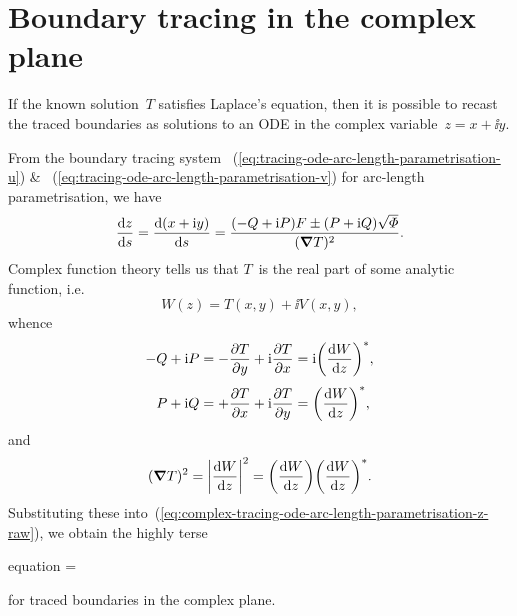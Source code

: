 \chapter{Boundary tracing in the complex plane}
\label{ch:complex}

If the known solution~$T$ satisfies Laplace's equation,
then it is possible to recast the traced boundaries
as solutions to an ODE in the complex variable~$z = x + \ii y$.

From the boundary tracing system~%
  (\ref{eq:tracing-ode-arc-length-parametrisation-u})
\&~%
  (\ref{eq:tracing-ode-arc-length-parametrisation-v})
for arc-length parametrisation,
we have
\begin{equation}
  \tder{z}{s}
    = \tder{(x + \ii y)}{s}
    = \frac{(-Q + \ii P) F \pm (P + \ii Q) \sqrt{\Phi}}{(\del T)^2}.
  \label{eq:complex-tracing-ode-arc-length-parametrisation-z-raw}
\end{equation}
Complex function theory tells us that
$T$~is the real part of some analytic function,
i.e.
\begin{equation}
  W (z) = T (x, y) + \ii V (x, y),
  \label{eq:complex-analytic-function-components}
\end{equation}
whence
\begin{align}
  -Q + \ii P
    &= -\pder{T}{y} + \ii \pder{T}{x}
    = \ii \conj{\roundbr*{\tder{W}{z}}},
      \label{eq:complex-tracing-ode-flux-factor}
      \\[\tallspace]
  P + \ii Q
    &= +\pder{T}{x} + \ii \pder{T}{y}
    = \conj{\roundbr*{\tder{W}{z}}},
      \label{eq:complex-tracing-ode-viability-factor}
\end{align}
and
\begin{equation}
  (\del T)^2
    = \abs*{\tder{W}{z}}^2
    = \roundbr*{\tder{W}{z}} \conj{\roundbr*{\tder{W}{z}}}.
  \label{eq:complex-tracing-gradient-squared}
\end{equation}
Substituting these
into~(\ref{eq:complex-tracing-ode-arc-length-parametrisation-z-raw}),
we obtain the highly terse
\begin{important}{equation}
   = 
  \label{eq:complex-tracing-ode-arc-length-parametrisation-z}
\end{important}
for traced boundaries in the complex plane.

